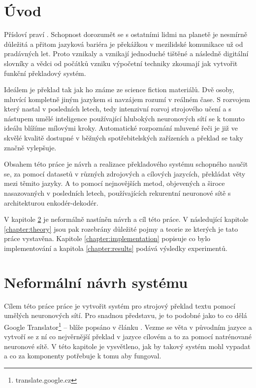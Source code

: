 \chapter{Úvod}
Přísloví praví . Schopnost dorozumět se s ostatními lidmi na planetě je nesmírně důležitá a přitom jazyková bariéra je překážkou v mezilidské komunikace už od pradávných let. Proto vznikaly a vznikají jednoduché tištěné a následně digitální slovníky a vědci od počátků vzniku výpočetní techniky zkoumají jak vytvořit funkční překladový systém.

Ideálem je překlad tak jak ho známe ze science fiction materiálů. Dvě osoby, mluvící kompletně jiným jazykem si navzájem rozumí v reálném čase. S rozvojem který nastal v posledních letech, tedy intenzivní rozvoj strojového učení a s nástupem umělé inteligence používající hlubokých neuronových sítí se k tomuto ideálu blížíme mílovými kroky. Automatické rozpoznání mluvené řeči je již ve skvělé kvalitě dostupné v běžných spotřebitelských zařízeních a překlad se taky značně vylepšuje.

Obsahem této práce je návrh a realizace překladového systému schopného naučit se, za pomocí datasetů v různých zdrojových a cílových jazycích, překládat věty mezi těmito jazyky. A to pomocí nejnovějších metod, objevených a široce nasazovaných v posledních letech, používajících rekurentní neuronové sítě s architekturou enkodér-dekodér.

V kapitole \ref{chapter:draft} je neformálně nastíněn návrh a cíl této práce. V následující kapitole \ref{chapter:theory} jsou pak rozebrány důležité pojmy a teorie ze kterých je tato práce vystavěna. Kapitole \ref{chapter:implementation} popisuje co bylo implementování a kapitola \ref{chapter:results} podává výsledky experimentů.

\chapter{Neformální návrh systému} \label{chapter:draft}
Cílem této práce práce je vytvořit systém pro strojový překlad textu pomocí umělých neuronových sítí. Pro snadnou představu, je to podobné jako to co dělá Google Translator\footnote{translate.google.cz} -- blíže popsáno v článku \cite{googleBridgingGap}. Vezme se věta v původním jazyce a vytvoří se z ní co nejvěrnější překlad v jazyce cílovém a to za pomocí natrénované neuronové sítě. V této kapitole je vysvětleno, jak by takový systém mohl vypadat a co za komponenty potřebuje k tomu aby fungoval.

